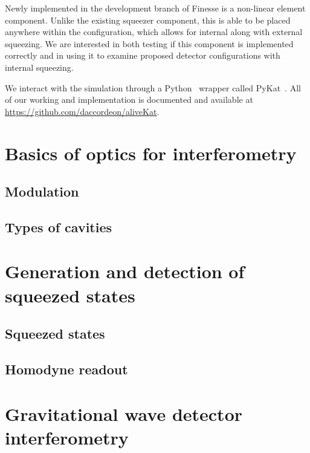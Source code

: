 \documentclass[aps,pra,superscriptaddress,reprint,nofootinbib]{revtex4-1}
\begin{document}
Newly implemented in the development branch of Finesse is a non-linear element component. Unlike the existing squeezer component, this is able to be placed anywhere within the configuration, which allows for internal along with external squeezing. We are interested in both testing if this component is implemented correctly and in using it to examine proposed detector configurations with internal squeezing.


We interact with the simulation through a Python~\cite{python} wrapper called PyKat~\cite{finesse}. All of our working and implementation is documented and available at \url{https://github.com/daccordeon/aliveKat}.


\section{Basics of optics for interferometry}
\label{sec:basics}

\subsection{Modulation}

\subsection{Types of cavities}


\section{Generation and detection of squeezed states}
\label{sec:squeezing}

\subsection{Squeezed states}


\subsection{Homodyne readout}



\section{Gravitational wave detector interferometry}
\label{sec:gwIFO}
\end{document}
